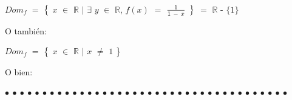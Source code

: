 \documentclass[12pt]{article}
\newenvironment{MyColorPar}[1]{%
    \leavevmode\color{#1}\ignorespaces%
}{%
}%
\begin{document}
\begin{MyColorPar}{Lochinvar}
\hspace{2cm} $Dom_{f}$ $=$ $\big{\{}$ $x$ $\in$ $\mathbb{R}$ $\mid$ $\exists$ $y$ $\in$ $\mathbb{R}$, $f(x)$ $=$ {\LARGE{$\frac{1}{1 \hspace{0.1cm} - \hspace{0.1cm} x}$}} $\big{\}}$ $=$ $\mathbb{R}$ - $\{ 1 \}$ \vspace{0.5cm}

O también: 

\hspace{2cm} $Dom_{f}$ $=$ $\big{\{}$ $x$ $\in$ $\mathbb{R}$ $\mid$  $x$ $\neq$ $1$ $\big{\}}$ \vspace{0.5cm}

O bien: 

\hspace{3cm}  \vspace{0.5cm}

\end{MyColorPar}


\begin{MyColorPar}{Saffron} \bfseries{
 $\bullet$ $\bullet$ $\bullet$ $\bullet$ $\bullet$ $\bullet$ $\bullet$ $\bullet$ $\bullet$ $\bullet$ $\bullet$ $\bullet$ $\bullet$ $\bullet$ $\bullet$ $\bullet$ $\bullet$ $\bullet$ $\bullet$ $\bullet$ $\bullet$ $\bullet$ $\bullet$ $\bullet$ $\bullet$ $\bullet$ $\bullet$ $\bullet$ $\bullet$ $\bullet$ $\bullet$ $\bullet$ $\bullet$ $\bullet$ $\bullet$ $\bullet$ $\bullet$ $\bullet$  }
\end{MyColorPar}
\end{document}
